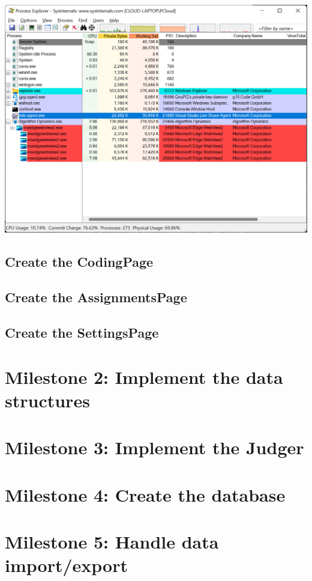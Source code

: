 \documentclass[a4paper]{report}
\begin{document}
\includegraphics[width=\textwidth, height=\textheight, keepaspectratio]{Process-Explorer-WebView2-Destroyed}

\subsection{Create the CodingPage}

\subsection{Create the AssignmentsPage}

\subsection{Create the SettingsPage}

\section{Milestone 2: Implement the data structures}

\section{Milestone 3: Implement the Judger}

\section{Milestone 4: Create the database}

\section{Milestone 5: Handle data import/export}
\end{document}
